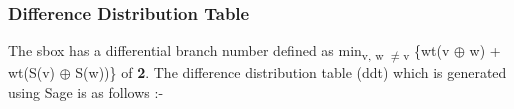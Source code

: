 \documentclass[journal=tosc,preprint]{iacrtrans}
\begin{document}
\subsubsection{Difference Distribution Table}
The sbox has a differential branch number defined as min\textsubscript{v, w $\neq$v} \{wt(v $\oplus$ w) + wt(S(v) $\oplus$ S(w))\} of \textbf{2}. The difference distribution table (ddt) which is generated using Sage is as follows :- \newpage
\begin{table}[h]
	\centering
\end{table}
\end{document}
